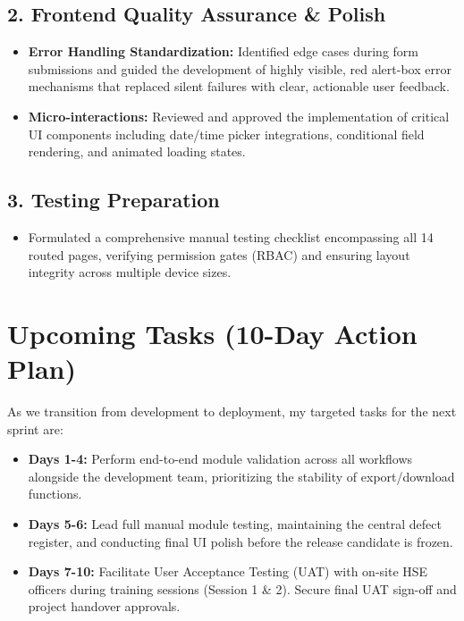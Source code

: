 \documentclass[12pt, a4paper]{article}
\begin{document}
\subsection{2. Frontend Quality Assurance \& Polish}
\begin{itemize}[leftmargin=*, label=$\circ$]
    \item \textbf{Error Handling Standardization:} Identified edge cases during form submissions and guided the development of highly visible, red alert-box error mechanisms that replaced silent failures with clear, actionable user feedback.
    \item \textbf{Micro-interactions:} Reviewed and approved the implementation of critical UI components including date/time picker integrations, conditional field rendering, and animated loading states.
\end{itemize}

\subsection{3. Testing Preparation}
\begin{itemize}[leftmargin=*, label=$\circ$]
    \item Formulated a comprehensive manual testing checklist encompassing all 14 routed pages, verifying permission gates (RBAC) and ensuring layout integrity across multiple device sizes.
\end{itemize}

\section{Upcoming Tasks (10-Day Action Plan)}
As we transition from development to deployment, my targeted tasks for the next sprint are:
\begin{itemize}
    \item \textbf{Days 1-4:} Perform end-to-end module validation across all workflows alongside the development team, prioritizing the stability of export/download functions.
    \item \textbf{Days 5-6:} Lead full manual module testing, maintaining the central defect register, and conducting final UI polish before the release candidate is frozen.
    \item \textbf{Days 7-10:} Facilitate User Acceptance Testing (UAT) with on-site HSE officers during training sessions (Session 1 \& 2). Secure final UAT sign-off and project handover approvals.
\end{itemize}
\end{document}

